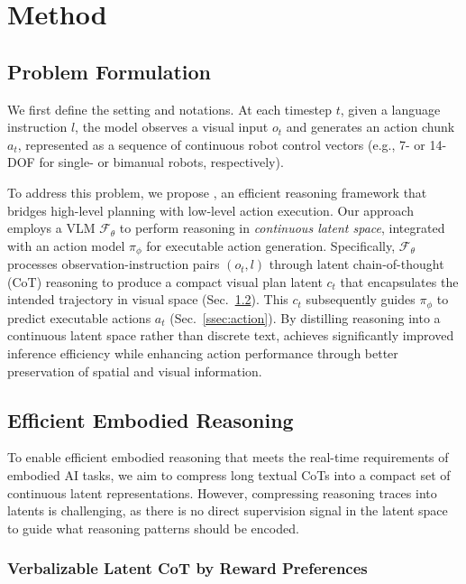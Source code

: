 \section{Method}
\label{sec:method}



\subsection{Problem Formulation}

We first define the setting and notations. At each timestep $t$, given a language instruction $l$, the model observes a visual input $o_t$ and generates an action chunk $a_t$, represented as a sequence of continuous robot control vectors (e.g., 7- or 14-DOF for single- or bimanual robots, respectively).

To address this problem, we propose \ours{}, an efficient reasoning framework that bridges high-level planning with low-level action execution. Our approach employs a VLM $\mathcal{F}_\theta$ to perform reasoning in \textit{continuous latent space}, integrated with an action model $\pi_\phi$ for executable action generation. Specifically, $\mathcal{F}_\theta$ processes observation-instruction pairs $(o_t, l)$ through latent chain-of-thought (CoT) reasoning to produce a compact visual plan latent $c_t$ that encapsulates the intended trajectory in visual space (Sec.~\ref{ssec:reasoning}). This $c_t$ subsequently guides $\pi_\phi$ to predict executable actions $a_t$ (Sec.~\ref{ssec:action}). By distilling reasoning into a continuous latent space rather than discrete text, \ours{} achieves significantly improved inference efficiency while enhancing action performance through better preservation of spatial and visual information.



\subsection{Efficient Embodied Reasoning}\label{ssec:reasoning}

To enable efficient embodied reasoning that meets the real-time requirements of embodied AI tasks, we aim to compress long textual CoTs into a compact set of continuous latent representations. However, compressing reasoning traces into latents is challenging, as there is no direct supervision signal in the latent space to guide what reasoning patterns should be encoded.

\subsubsection{Verbalizable Latent CoT by Reward Preferences}\label{sssec:verbalize}


